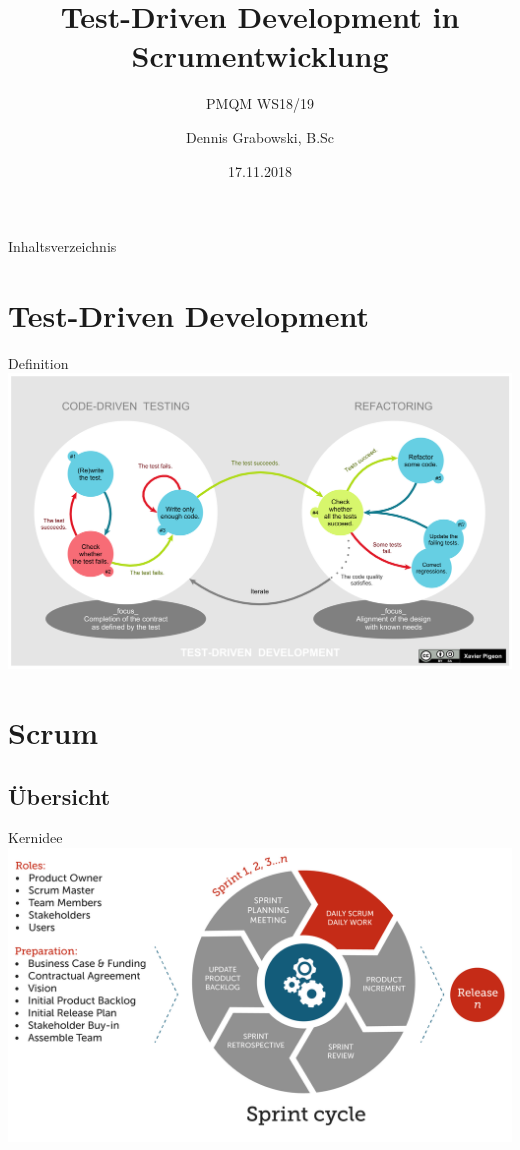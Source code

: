 \documentclass{f4_beamer_metropolis}
\title{Test-Driven Development in Scrumentwicklung}
\subtitle{PMQM WS18/19}
\author{Dennis Grabowski, B.Sc}
\date{17.11.2018}
\begin{document}
\begin{frame}{Inhaltsverzeichnis}
    \tableofcontents[hideallsubsections]
  \end{frame}

\section{Test-Driven Development}

\begin{frame}{Definition}
  \includegraphics[width=\textwidth,height=0.85\textheight,keepaspectratio]{./images/1920px-TDD_Global_Lifecycle.png}
  \nocite{TDD.Picture}
\end{frame}

\section{Scrum}

\subsection{Übersicht}

\begin{frame}{Kernidee}
  \includegraphics[width=\textwidth,height=0.9\textheight,keepaspectratio]{./images/the-daily-scrum-in-the-sprint-cycle}
  \nocite{ManifestoDigital}
\end{frame}
\end{document}
